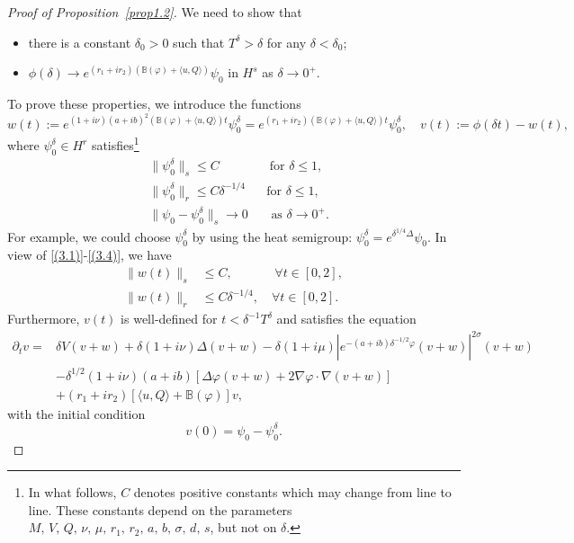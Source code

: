 \documentclass[review]{elsarticle}
\theoremstyle{dotless}
\def \leq{\leqslant}
\numberwithin{equation}{section}
\begin{document}
\begin{proof}[Proof of Proposition~\ref{prop1.2}]
We need to show that
\begin{itemize}
	\item[(a)] there is a constant $\delta_0>0$ such that $T^\delta>\delta$ for any $\delta<\delta_0$;
	\item[(b)] $\phi(\delta) \rightarrow e^{(r_1+i r_2)\left( \mathbb{B}(\varphi)+\langle u, Q\rangle\right)} \psi_0$ in $H^s$ as $\delta \rightarrow 0^{+}$.
\end{itemize}
To prove these properties, we introduce the functions
\begin{equation}
	w(t):=e^{(1+i\nu)(a+ib)^2\left( \mathbb{B}(\varphi)+\langle u, Q\rangle\right) t} \psi_0^\delta=e^{(r_1+i r_2)\left( \mathbb{B}(\varphi)+\langle u, Q\rangle\right) t} \psi_0^\delta, \quad v(t):=\phi(\delta t)-w(t),
\end{equation}
where $\psi_0^\delta \in H^r$ satisfies\footnote{In what follows, $C$ denotes positive constants which may change from line to line. These constants depend on the parameters $M,\, V,\, Q, \,\nu,\, \mu,\, r_1,\, r_2,\, a,\, b,\, \sigma,\, d,\, s$, but not on $\delta$.}
\begin{align}
	&\|\psi_0^\delta\|_{s}  \leq C  \quad\quad\quad  \quad \text{for } \delta\leq 1,\label{(3.3)}\\
	& \|\psi_0^\delta\|_r \leq C   \delta^{-1/4}  \,\,\,\,\quad \text{for } \delta\leq 1,\label{(3.4)}\\
	&  \|	\psi_0-\psi_0^\delta\|_s\to 0  \quad\,\,\, \text{ as $\delta\to 0^+$}.\nonumber
\end{align}
For example, we could choose $\psi_0^\delta$ by using the heat semigroup: $\psi_0^\delta=e^{\delta^{1 / 4} \Delta} \psi_0$. In view of \eqref{(3.1)}-\eqref{(3.4)}, we have
\begin{align}
	\|w(t)\|_s &\leq C,\quad\,\,\quad\quad \forall t \in[0,2], \label{(3.5)}\\
	\|w(t)\|_r &\leq C \delta^{-1 / 4}, \quad \forall t \in[0,2] .\label{(3.6)}
\end{align}
Furthermore, $v(t)$ is well-defined for $t<\delta^{-1} T^\delta$ and satisfies the equation
\begin{align}
	\partial_t v= &\delta V(v+w) + \delta (1+i\nu)\Delta(v+w) -\delta (1+i\mu)|e^{-(a+ib)\delta^{-1/2}\varphi}(v+w)|^{2\sigma}(v+w)\nonumber\\
	& -\delta^{1/2}(1+i\nu)(a+ib)\left[\Delta\varphi(v+w) + 2\nabla\varphi\cdot\nabla(v+w)\right]\nonumber \\
	& +(r_1+ir_2)\left[\langle u,Q\rangle  +\mathbb{B}(\varphi)\right]v, \label{(3.7)}
\end{align}
with the initial condition
\begin{equation}\label{(3.8)}
	v(0)=\psi_0-\psi_0^\delta.
\end{equation}


\end{proof}
\end{document}
